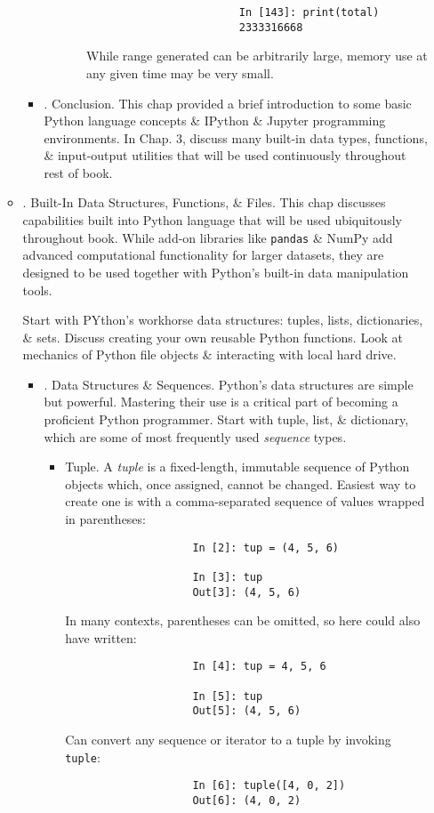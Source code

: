 \documentclass{article}
\begin{document}
\begin{enumerate}
\begin{itemize}
\begin{itemize}
\begin{itemize}
\begin{itemize}
\begin{verbatim}
						In [143]: print(total)
						2333316668
					\end{verbatim}
					While range generated can be arbitrarily large, memory use at any given time may be very small.
				\end{itemize}
			\end{itemize}
			\item {. Conclusion.} This chap provided a brief introduction to some basic Python language concepts \& IPython \& Jupyter programming environments. In Chap. 3, discuss many built-in data types, functions, \& input-output utilities that will be used continuously throughout rest of book.
		\end{itemize}
		\item {. Built-In Data Structures, Functions, \& Files.} This chap discusses capabilities built into Python language that will be used ubiquitously throughout book. While add-on libraries like {\tt pandas} \& NumPy add advanced computational functionality for larger datasets, they are designed to be used together with Python's built-in data manipulation tools.
		
		Start with PYthon's workhorse data structures: tuples, lists, dictionaries, \& sets. Discuss creating your own reusable Python functions. Look at mechanics of Python file objects \& interacting with local hard drive.
		\begin{itemize}
			\item {. Data Structures \& Sequences.} Python's data structures are simple but powerful. Mastering their use is a critical part of becoming a proficient Python programmer. Start with tuple, list, \& dictionary, which are some of most frequently used {\it sequence} types.
			\begin{itemize}
				\item {\sf Tuple.} A {\it tuple} is a fixed-length, immutable sequence of Python objects which, once assigned, cannot be changed. Easiest way to create one is with a comma-separated sequence of values wrapped in parentheses:
				\begin{verbatim}
					In [2]: tup = (4, 5, 6)
					
					In [3]: tup
					Out[3]: (4, 5, 6)
				\end{verbatim}
				In many contexts, parentheses can be omitted, so here could also have written:
				\begin{verbatim}
					In [4]: tup = 4, 5, 6
					
					In [5]: tup
					Out[5]: (4, 5, 6)
				\end{verbatim}
				Can convert any sequence or iterator to a tuple by invoking {\tt tuple}:
				\begin{verbatim}
					In [6]: tuple([4, 0, 2])
					Out[6]: (4, 0, 2)
					

\end{verbatim}
\end{itemize}
\end{itemize}
\end{itemize}
\end{enumerate}
\end{document}
